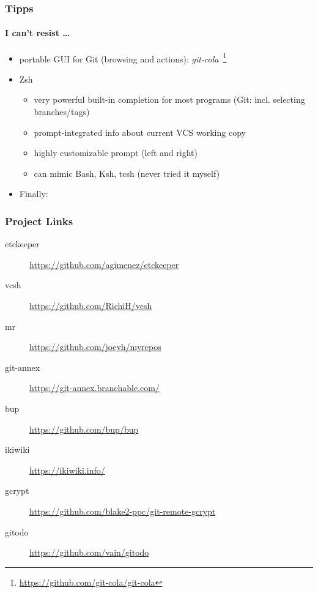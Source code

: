 \documentclass[english,hyperref={pdfpagelabels=false},aspectratio=169]{beamer}
\begin{document}
\begin{frame}[label=tipps]
  \frametitle{Tipps}
  \framesubtitle{I can't resist \dots}
  \begin{itemize}
    \item portable GUI for Git {\scriptsize\color{fzjgray50}(browsing and actions)}: \textit{git-cola}~\footnote{\tiny\url{https://github.com/git-cola/git-cola}}
    \item Zsh
      \begin{itemize}
        \item very powerful built-in completion for most programs {\scriptsize\color{fzjgray50}(Git: incl. selecting branches/tags)}
        \item prompt-integrated info about current VCS working copy
        \item highly customizable prompt {\scriptsize\color{fzjgray50}(left and right)}
        \item can mimic Bash, Ksh, tcsh {\scriptsize\color{fzjgray50}(never tried it myself)}
      \end{itemize}
    \item Finally:
      \begin{center}
      \end{center}
  \end{itemize}
\end{frame}


\begin{frame}
  \frametitle{Project Links}
  \begin{description}
    \item[etckeeper] \url{https://github.com/agimenez/etckeeper}
    \item[vcsh] \url{https://github.com/RichiH/vcsh}
    \item[mr] \url{https://github.com/joeyh/myrepos}
    \item[git-annex] \url{https://git-annex.branchable.com/}
    \item[bup] \url{https://github.com/bup/bup}
    \item[ikiwiki] \url{https://ikiwiki.info/}
    \item[gcrypt] \url{https://github.com/blake2-ppc/git-remote-gcrypt}
    \item[gitodo] \url{https://github.com/vain/gitodo}
  \end{description}
\end{frame}
\end{document}
